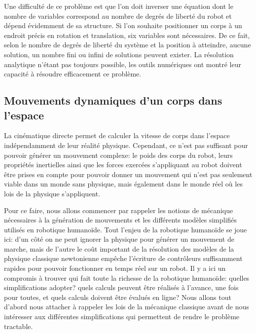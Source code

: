 Une difficulté de ce problème est que l'on doit inverser une équation
dont le nombre de variables correspond au nombre de degrés de liberté
du robot et dépend évidemment de sa structure. Si l'on souhaite
positionner un corps à un endroit précis en rotation et translation,
six variables sont nécessaires. De ce fait, selon le nombre de degrés
de liberté du système et la position à atteindre, aucune solution, un
nombre fini ou infini de solutions peuvent exister. La résolution
analytique n'étant pas toujours possible, les outils numériques ont
montré leur capacité à résoudre efficacement ce problème.



\subsection{Mouvements dynamiques d'un corps dans l'espace}

La cinématique directe permet de calculer la vitesse de corps dans
l'espace indépendamment de leur réalité physique. Cependant, ce n'est
pas suffisant pour pouvoir générer un mouvement complexe: le poids des
corps du robot, leurs propriétés inertielles ainsi que les forces
exercées s'appliquant au robot doivent être prises en compte pour
pouvoir donner un mouvement qui n'est pas seulement viable dans un
monde sans physique, mais également dans le monde réel où les lois de
la physique s'appliquent.

Pour ce faire, nous allons commencer par rappeler les notions de
mécanique nécessaires à la génération de mouvements et les différents
modèles simplifiés utilisés en robotique humanoïde. Tout l'enjeu de la
robotique humanoïde se joue ici: d'un côté on ne peut ignorer la
physique pour générer un mouvement de marche, mais de l'autre le coût
important de la résolution des modèles de la physique classique
newtonienne empêche l'écriture de contrôleurs suffisamment rapides
pour pouvoir fonctionner en temps réel sur un robot. Il y a ici un
compromis à trouver qui fait toute la richesse de la robotique
humanoïde: quelles simplifications adopter? quels calculs peuvent être
réalisés à l'avance, une fois pour toutes, et quels calculs doivent
être évalués en ligne? Nous allons tout d'abord nous attacher à
rappeler les lois de la mécanique classique avant de nous intéresser
aux différentes simplifications qui permettent de rendre le problème
tractable.


